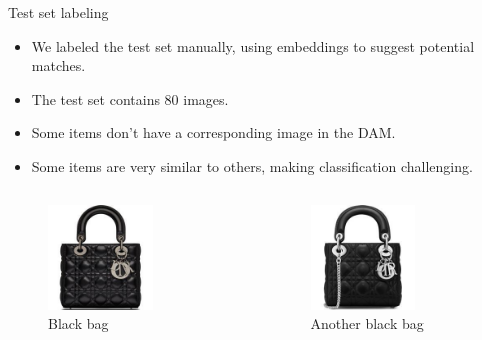 \documentclass{beamer}
\begin{document}
\begin{frame}{Test set labeling}
    \begin{itemize}
        \item We labeled the test set manually, using embeddings to suggest potential matches.
        \item The test set contains 80 images.
        \item Some items don't have a corresponding image in the DAM.
        \item Some items are very similar to others, making classification challenging.
    \end{itemize}
    \begin{columns}
        \begin{figure}
            \includegraphics[width=0.65\textwidth]{assets/very_similar_items_1.jpeg}
            \caption{Black bag}
        \end{figure}
        \begin{figure}
            \includegraphics[width=0.65\textwidth]{assets/very_similar_items_2.jpeg}
            \caption{Another black bag}
        \end{figure}
    \end{columns}
\end{frame}
\end{document}
